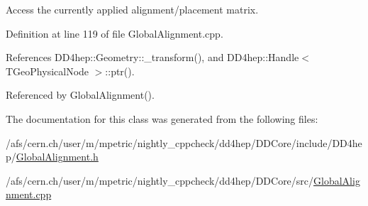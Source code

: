 Access the currently applied alignment/placement matrix. 

Definition at line 119 of file Global\+Alignment.\+cpp.



References D\+D4hep\+::\+Geometry\+::\+\_\+transform(), and D\+D4hep\+::\+Handle$<$ T\+Geo\+Physical\+Node $>$\+::ptr().



Referenced by Global\+Alignment().



The documentation for this class was generated from the following files\+:\begin{DoxyCompactItemize}
\item 
/afs/cern.\+ch/user/m/mpetric/nightly\+\_\+cppcheck/dd4hep/\+D\+D\+Core/include/\+D\+D4hep/\hyperlink{_global_alignment_8h}{Global\+Alignment.\+h}\item 
/afs/cern.\+ch/user/m/mpetric/nightly\+\_\+cppcheck/dd4hep/\+D\+D\+Core/src/\hyperlink{_global_alignment_8cpp}{Global\+Alignment.\+cpp}\end{DoxyCompactItemize}

